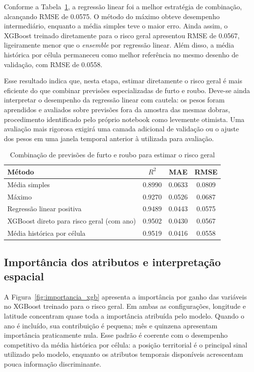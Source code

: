\documentclass[12pt]{article}
\begin{document}
Conforme a Tabela~\ref{tab:ensemble_xgb}, a regressão linear foi a melhor estratégia de combinação, alcançando RMSE de 0.0575. O método do máximo obteve desempenho intermediário, enquanto a média simples teve o maior erro. Ainda assim, o XGBoost treinado diretamente para o risco geral apresentou RMSE de 0.0567, ligeiramente menor que o \textit{ensemble} por regressão linear. Além disso, a média histórica por célula permaneceu como melhor referência no mesmo desenho de validação, com RMSE de 0.0558.

Esse resultado indica que, nesta etapa, estimar diretamente o risco geral é mais eficiente do que combinar previsões especializadas de furto e roubo. Deve-se ainda interpretar o desempenho da regressão linear com cautela: os pesos foram aprendidos e avaliados sobre previsões fora da amostra das mesmas dobras, procedimento identificado pelo próprio notebook como levemente otimista. Uma avaliação mais rigorosa exigirá uma camada adicional de validação ou o ajuste dos pesos em uma janela temporal anterior à utilizada para avaliação.

\begin{table}[!htbp]
\centering
\caption{Combinação de previsões de furto e roubo para estimar o risco geral}
\label{tab:ensemble_xgb}
\small
\renewcommand{\arraystretch}{1.15}
\begin{tabular}{|l|c|c|c|}
\hline
\textbf{Método} & \textbf{$R^2$} & \textbf{MAE} & \textbf{RMSE} \\
\hline
Média simples & 0.8990 & 0.0633 & 0.0809 \\
Máximo & 0.9270 & 0.0526 & 0.0687 \\
Regressão linear positiva & 0.9489 & 0.0443 & 0.0575 \\
\hline
XGBoost direto para risco geral (com ano) & 0.9502 & 0.0430 & 0.0567 \\
Média histórica por célula & 0.9519 & 0.0416 & 0.0558 \\
\hline
\end{tabular}
\end{table}

\subsection{Importância dos atributos e interpretação espacial}

A Figura~\ref{fig:importancia_xgb} apresenta a importância por ganho das variáveis no XGBoost treinado para o risco geral. Em ambas as configurações, longitude e latitude concentram quase toda a importância atribuída pelo modelo. Quando o ano é incluído, sua contribuição é pequena; mês e quinzena apresentam importância praticamente nula. Esse padrão é coerente com o desempenho competitivo da média histórica por célula: a posição territorial é o principal sinal utilizado pelo modelo, enquanto os atributos temporais disponíveis acrescentam pouca informação discriminante.
\end{document}
